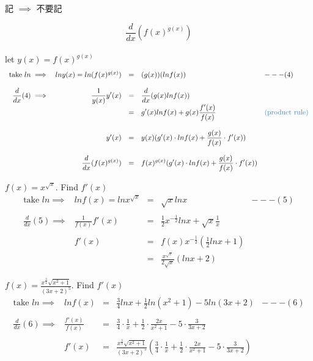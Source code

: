 \begin{jk}
記 $\implies$ 不要記
\end{jk}

\begin{eg}
$$\displaystyle \frac{d}{dx} (f(x)^{g(x)})$$\\
let $y(x) = f(x)^{g(x)}$
$$\begin{array}{rrcll}
\text{take } ln \implies & ln y(x) = ln(f(x)^{g(x)}) & = & (g(x))(ln f(x)) & ---(4)\\\\
\displaystyle \frac{d}{dx}(4) \implies & \displaystyle \frac{1}{y(x)} y'(x) & = & \displaystyle \frac{d}{dx}(g(x) lnf(x))\\
&& = & \displaystyle g'(x) lnf(x) + g(x) \frac{f'(x)}{f(x)} & \tssteelblue{(\text{product rule})}\\\\
& y'(x) & = & \displaystyle y(x)(g'(x) \cdot lnf(x) + \frac{g(x)}{f(x)} \cdot f'(x))\\\\
& \displaystyle \frac{d}{dx} (f(x)^{g(x)}) & = & \displaystyle f(x)^{g(x)} (g'(x) \cdot lnf(x) + \frac{g(x)}{f(x)} \cdot f'(x))
\end{array}$$
\end{eg}
\begin{eg}
$f(x) = x^{\sqrt{x}}$. Find $f'(x)$
$$\begin{array}{rrcll}
\text{take } ln \implies & lnf(x) = ln x^{\sqrt{x}} & = & \sqrt{x} ln x & ---(5)\\\\
\displaystyle \frac{d}{dx}(5) \implies & \frac{1}{f(x)}f'(x) & = & \displaystyle \frac{1}{2}x^{-\frac{1}{2}} lnx + \sqrt{x} \frac{1}{x}\\\\
& f'(x) & = & \displaystyle f(x)x^{-\frac{1}{2}}(\frac{1}{2}lnx+1)\\
&& = & \displaystyle \frac{x^{\sqrt{x}}}{2\sqrt{x}}(ln x +2)
\end{array}$$
\end{eg}
\begin{eg}
$\displaystyle f(x) = \frac{x^{\frac{3}{4}}\sqrt{x^2+1}}{(3x+2)^5}$. Find $f'(x)$
$$\begin{array}{rrcll}
\text{take } ln \implies & lnf(x) & = & \displaystyle \frac{3}{4} lnx + \frac{1}{2}ln(x^2+1) - 5ln(3x+2) & ---(6)\\\\
\displaystyle \frac{d}{dx}(6) \implies & \displaystyle \frac{f'(x)}{f(x)} & = & \displaystyle \frac{3}{4} \cdot  \frac{1}{x} + \frac{1}{2} \cdot \frac{2x}{x^2+1} -5 \cdot \frac{3}{3x+2}\\\\
& f'(x) & = & \displaystyle \frac{x^{\frac{3}{4}}\sqrt{x^2+1}}{(3x+2)^5} (\frac{3}{4} \cdot \frac{1}{x} + \frac{1}{2} \cdot \frac{2x}{x^2+1} -5 \cdot \frac{3}{3x+2})
\end{array}$$
\end{eg}
